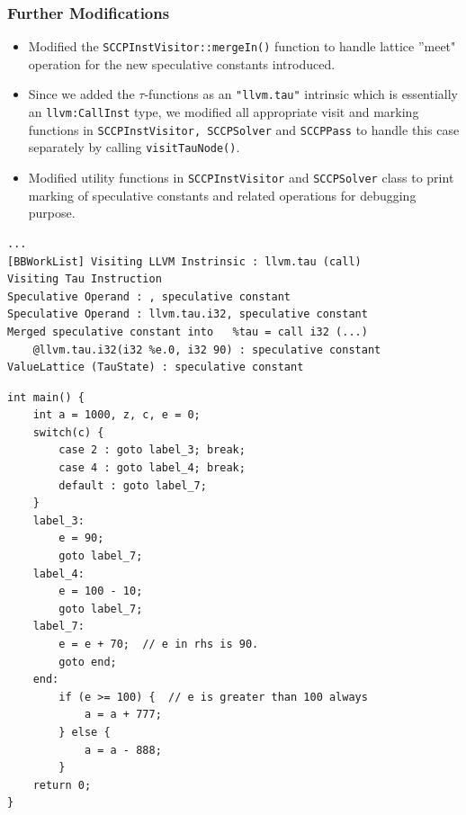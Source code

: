 \documentclass{beamer}
\begin{document}
\begin{frame}[fragile]
	\frametitle{Further Modifications}
	\begin{itemize}
		\item Modified the \texttt{SCCPInstVisitor::mergeIn()} function to handle lattice ''meet" operation for the new speculative constants introduced.  
		\item Since we added the $\tau$-functions as an \texttt{"llvm.tau"} intrinsic which is essentially an \texttt{llvm:CallInst} type, we modified all appropriate visit and marking functions in \texttt{SCCPInstVisitor, SCCPSolver} and \texttt{SCCPPass} to handle this case separately by calling \texttt{visitTauNode()}.
		\item Modified utility functions in \texttt{SCCPInstVisitor} and \texttt{SCCPSolver} class to print marking of speculative constants and related operations for debugging purpose.
	\end{itemize}
\begin{verbatim}
...
[BBWorkList] Visiting LLVM Instrinsic : llvm.tau (call)
Visiting Tau Instruction
Speculative Operand : , speculative constant
Speculative Operand : llvm.tau.i32, speculative constant
Merged speculative constant into   %tau = call i32 (...) 
	@llvm.tau.i32(i32 %e.0, i32 90) : speculative constant
ValueLattice (TauState) : speculative constant
\end{verbatim}
\end{frame}

\begin{frame}[fragile]
\begin{verbatim}
int main() {
	int a = 1000, z, c, e = 0;
	switch(c) {   
		case 2 : goto label_3; break;
		case 4 : goto label_4; break;
		default : goto label_7;
	}
	label_3:
		e = 90;
		goto label_7;
	label_4:
		e = 100 - 10;
		goto label_7;
	label_7:
		e = e + 70;  // e in rhs is 90.
		goto end;
	end:
		if (e >= 100) {  // e is greater than 100 always
			a = a + 777;
		} else {
			a = a - 888;
		}
	return 0;
}
\end{verbatim}
\end{frame}
\end{document}
